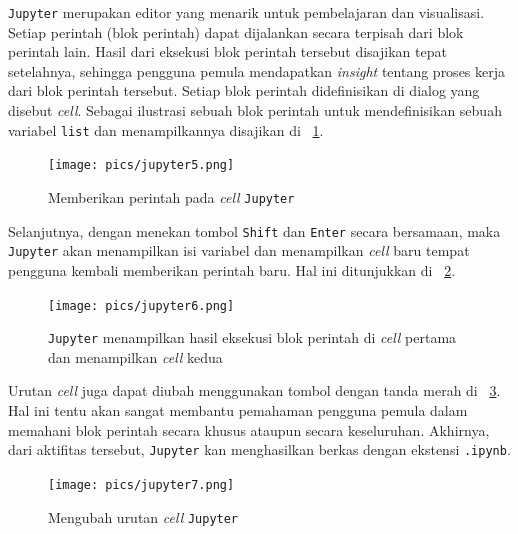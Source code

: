 \texttt{Jupyter} merupakan editor yang menarik untuk pembelajaran dan visualisasi. Setiap perintah (blok perintah) dapat dijalankan secara terpisah dari blok perintah lain. Hasil dari eksekusi blok perintah tersebut disajikan tepat setelahnya, sehingga pengguna pemula mendapatkan \textit{insight} tentang proses kerja dari blok perintah tersebut. Setiap blok perintah didefinisikan di dialog yang disebut \textit{cell}. Sebagai ilustrasi sebuah blok perintah untuk mendefinisikan sebuah variabel \texttt{list} dan menampilkannya disajikan di \figurename~\ref{fig:jupiterBlock}.

\begin{figure}
  \begin{center}
    \texttt{[image: pics/jupyter5.png]}
    \caption{Memberikan perintah pada \textit{cell} \texttt{Jupyter}}
    \label{fig:jupiterBlock}
  \end{center}
\end{figure}

Selanjutnya, dengan menekan tombol \texttt{Shift} dan \texttt{Enter} secara bersamaan, maka \texttt{Jupyter} akan menampilkan isi variabel  dan menampilkan \textit{cell} baru tempat pengguna kembali memberikan perintah baru. Hal ini ditunjukkan di \figurename~\ref{fig:jupyterShiftEnter}.

\begin{figure}
  \begin{center}
    \texttt{[image: pics/jupyter6.png]}
    \caption{\texttt{Jupyter} menampilkan hasil eksekusi blok perintah di \textit{cell} pertama dan menampilkan \textit{cell} kedua}
    \label{fig:jupyterShiftEnter}
  \end{center}
\end{figure}

Urutan \textit{cell} juga dapat diubah menggunakan tombol dengan tanda merah di \figurename~\ref{fig:jupyterUbahUrutan}. Hal ini tentu akan sangat membantu pemahaman pengguna pemula dalam memahani blok perintah secara khusus ataupun secara keseluruhan. Akhirnya, dari aktifitas tersebut, \texttt{Jupyter} kan menghasilkan berkas dengan ekstensi \texttt{.ipynb}.

\begin{figure}
  \begin{center}
    \texttt{[image: pics/jupyter7.png]}
    \caption{Mengubah urutan \textit{cell} \texttt{Jupyter}}
    \label{fig:jupyterUbahUrutan}
  \end{center}
\end{figure}

